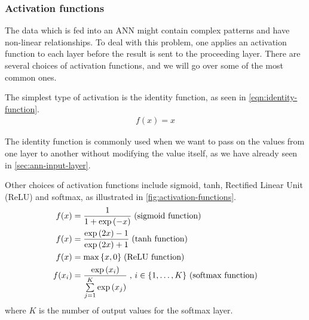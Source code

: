 \subsubsection{Activation functions}
\label{sec:activation-functions-ann}
The data which is fed into an ANN might contain complex patterns and have non-linear relationships. To deal with this problem, one applies an activation function to each layer before the result is sent to the proceeding layer. There are several choices of activation functions, and we will go over some of the most common ones.

The simplest type of activation is the identity function, as seen in \cref{eqn:identity-function}.
\begin{align}
    \label{eqn:identity-function}
    f(x) = x
\end{align}

The identity function is commonly used when we want to pass on the values from one layer to another without modifying the value itself, as we have already seen in \cref{sec:ann-input-layer}.

Other choices of activation functions include  sigmoid, tanh, Rectified Linear Unit (ReLU) and softmax, as illustrated in \cref{fig:activation-functions}.
\begin{align}
    \label{eqn:sigmoid-function}
    f(x) &= \frac{1}{1 + \exp{ \left( -x \right) }} \thickspace \text{(sigmoid function)} \\
    \label{eqn:tanh-function}
    f(x) &= \frac{\exp{ \left( 2x \right) } - 1}{\exp{ \left( 2x \right) } + 1} \thickspace \text{(tanh function)} \\
    \label{eqn:relu-function}
    f(x) &= \max{\left\{ x, 0 \right\}} \thickspace \text{(ReLU function)} \\
    \label{eqn:softmax-function}
    f(x_i) &= \frac{\exp \left( x_i \right)}{\sum\limits_{j=1}^{K} \exp \left( x_j \right)} \thickspace \text{, $i \in \left\{ 1, \ldots, K \right\}$ (softmax function)}
\end{align}
where $K$ is the number of output values for the softmax layer.

